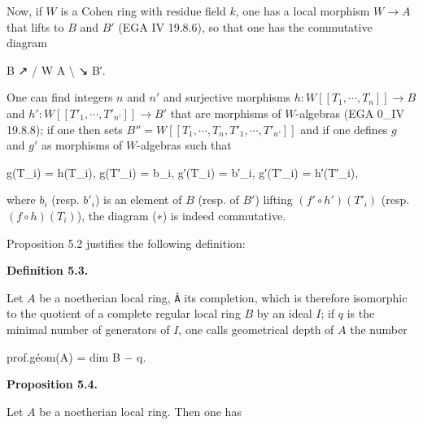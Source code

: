 \documentclass[
]{article}
\newenvironment{Shaded}{}{}
\newcommand{\NormalTok}[1]{#1}
\begin{document}
Now, if \(W\) is a Cohen ring with residue field \(k\), one has a local
morphism \(W \to A\) that lifts to \(B\) and \(B'\) (EGA IV 19.8.6), so
that one has the commutative diagram

\begin{Shaded}
\begin{Highlighting}[]
\NormalTok{                  B}
\NormalTok{                ↗}
\NormalTok{               /}
\NormalTok{          W              A}
\NormalTok{               \textbackslash{}}
\NormalTok{                ↘}
\NormalTok{                  B′.}
\end{Highlighting}
\end{Shaded}

One can find integers \(n\) and \(n'\) and surjective morphisms
\(h : W[[T_{1}, \cdots, T_{n}]] \to B\) and
\(h' : W[[T'_{1}, \cdots, T'_{n'}]] \to B'\) that are morphisms of
\(W\)-algebras (EGA 0\_IV 19.8.8); if one then sets
\(B'' = W[[T_{1}, \cdots, T_{n}, T'_{1}, \cdots, T'_{n'}]]\) and if one
defines \(g\) and \(g'\) as morphisms of \(W\)-algebras such that

\begin{Shaded}
\begin{Highlighting}[]
\NormalTok{g(T\_i) = h(T\_i),  g(T′\_i) = b\_i,  g′(T\_i) = b′\_i,  g′(T′\_i) = h′(T′\_i),}
\end{Highlighting}
\end{Shaded}

where \(b_{i}\) (resp. \(b'_{i}\)) is an element of \(B\) (resp. of
\(B'\)) lifting \((f' \circ h')(T'_{i})\) (resp.
\((f \circ h)(T_{i})\)), the diagram (∗) is indeed commutative.

Proposition 5.2 justifies the following definition:

\textbf{Definition 5.3.}

Let \(A\) be a noetherian local ring, \texttt{Â} its completion, which
is therefore isomorphic to the quotient of a complete regular local ring
\(B\) by an ideal \(I\); if \(q\) is the minimal number of generators of
\(I\), one calls geometrical depth of \(A\) the number

\begin{Shaded}
\begin{Highlighting}[]
\NormalTok{prof.géom(A) = dim B − q.}
\end{Highlighting}
\end{Shaded}

\textbf{Proposition 5.4.}

Let \(A\) be a noetherian local ring. Then one has
\end{document}
